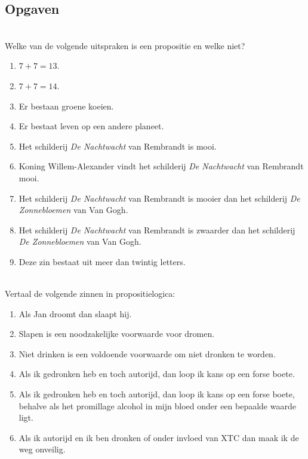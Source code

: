 \subsection{Opgaven}
\begin{exercise}[Proposities]\mbox{}\\
Welke van de volgende uitspraken is een propositie en welke niet?
\begin{enumerate}[label=\textit{\alph*.}]
\item $7+7 = 13$.
\item $7+7 = 14$.
\item Er bestaan groene koeien.
\item Er bestaat leven op een andere planeet.
\item Het schilderij \textit{De Nachtwacht} van Rembrandt is mooi.
\item Koning Willem-Alexander vindt het schilderij \textit{De Nachtwacht} van Rembrandt mooi.
\item Het schilderij \textit{De Nachtwacht} van Rembrandt is mooier dan het schilderij \textit{De Zonnebloemen} van Van Gogh.
\item Het schilderij \textit{De Nachtwacht} van Rembrandt is zwaarder dan het schilderij \textit{De Zonnebloemen} van Van Gogh.
\item Deze zin bestaat uit meer dan twintig letters.
\end{enumerate}
\end{exercise}

\begin{exercise}[Vertalen]\mbox{}\\
Vertaal de volgende zinnen in propositielogica:
\begin{enumerate}[label=\textit{\alph*.}]
\item Als Jan droomt dan slaapt hij.
\item Slapen is een noodzakelijke voorwaarde voor dromen.
\item Niet drinken is een voldoende voorwaarde om niet dronken te worden.
\item Als ik gedronken heb en toch autorijd, dan loop ik kans op een forse boete.
\item Als ik gedronken heb en toch autorijd, dan loop ik kans op een forse boete, behalve als het promillage alcohol in mijn bloed onder een bepaalde waarde ligt.
\item Als ik autorijd en ik ben dronken of onder invloed van XTC dan maak ik de weg onveilig.
\end{enumerate}
\end{exercise}

